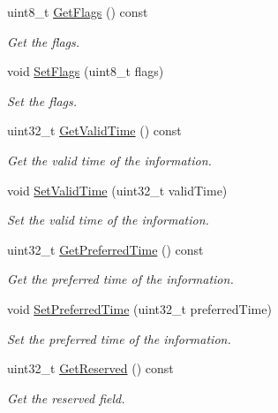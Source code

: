 \begin{DoxyCompactItemize}
uint8\+\_\+t \hyperlink{classns3_1_1Icmpv6OptionPrefixInformation_a61f72d6778819db66fe31c4c9d884a2f}{Get\+Flags} () const 
\begin{DoxyCompactList}\small\item\em Get the flags. \end{DoxyCompactList}\item 
void \hyperlink{classns3_1_1Icmpv6OptionPrefixInformation_a76d4d16a225d0a273d1920d37fd24337}{Set\+Flags} (uint8\+\_\+t flags)
\begin{DoxyCompactList}\small\item\em Set the flags. \end{DoxyCompactList}\item 
uint32\+\_\+t \hyperlink{classns3_1_1Icmpv6OptionPrefixInformation_a0bab6233aa33173b5e252e5b1f99fd44}{Get\+Valid\+Time} () const 
\begin{DoxyCompactList}\small\item\em Get the valid time of the information. \end{DoxyCompactList}\item 
void \hyperlink{classns3_1_1Icmpv6OptionPrefixInformation_a347652a0be0124b4fbd167116d0a84f1}{Set\+Valid\+Time} (uint32\+\_\+t valid\+Time)
\begin{DoxyCompactList}\small\item\em Set the valid time of the information. \end{DoxyCompactList}\item 
uint32\+\_\+t \hyperlink{classns3_1_1Icmpv6OptionPrefixInformation_acc3b6752fb25db072f55654997b7672f}{Get\+Preferred\+Time} () const 
\begin{DoxyCompactList}\small\item\em Get the preferred time of the information. \end{DoxyCompactList}\item 
void \hyperlink{classns3_1_1Icmpv6OptionPrefixInformation_ab329e95c80f0d20344ab78d1208e14b8}{Set\+Preferred\+Time} (uint32\+\_\+t preferred\+Time)
\begin{DoxyCompactList}\small\item\em Set the preferred time of the information. \end{DoxyCompactList}\item 
uint32\+\_\+t \hyperlink{classns3_1_1Icmpv6OptionPrefixInformation_a747c3cd9aa92661889174b57a4ccad17}{Get\+Reserved} () const 
\begin{DoxyCompactList}\small\item\em Get the reserved field. \end{DoxyCompactList}\item 

\end{DoxyCompactItemize}

